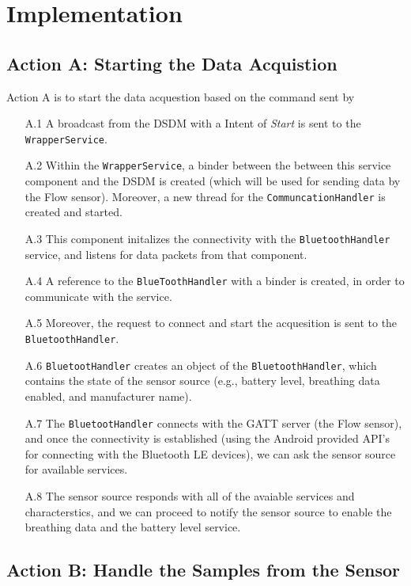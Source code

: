 \section{Implementation}


\subsection{Action A: Starting the Data Acquistion}
Action A is to start the data acquestion based on the command sent by 

\begin{itemize}
    \item[A.1] A broadcast from the DSDM with a Intent of \textit{Start} is sent to the \verb|WrapperService|.
    \item[A.2] Within the \verb|WrapperService|, a binder between the between this service component and the DSDM is created (which will be used for sending data by the Flow sensor). Moreover, a new thread for the \verb|CommuncationHandler| is created and started.
    \item[A.3] This component initalizes the connectivity with the \verb|BluetoothHandler| service, and listens for data packets from that component.
    \item[A.4] A reference to the \verb|BlueToothHandler| with a binder is created, in order to communicate with the service. 
    \item[A.5] Moreover, the request to connect and start the acquesition is sent to the \verb|BluetoothHandler|. 
    \item[A.6] \verb|BluetootHandler| creates an object of the \verb|BluetoothHandler|, which contains the state of the sensor source (e.g., battery level, breathing data enabled, and manufacturer name). 
    \item[A.7] The \verb|BluetootHandler| connects with the GATT server (the Flow sensor), and once the connectivity is established (using the Android provided API's for connecting with the Bluetooth LE devices), we can ask the sensor source for available services. 
    \item[A.8] The sensor source responds with all of the avaiable services and characterstics, and we can proceed to notify the sensor source to enable the breathing data and the battery level service.  
\end{itemize}


\subsection{Action B: Handle the Samples from the Sensor}

